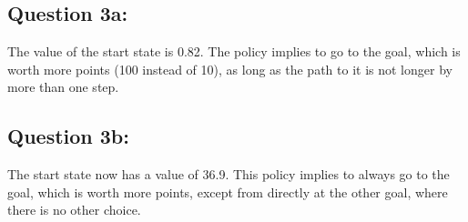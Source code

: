 \subsection*{Question 3a:}\label{sec:3a}

The value of the start state is 0.82.
The policy implies to go to the goal, which is worth more points (100 instead of 10), as long as the path to it is not longer by more than one step.

\subsection*{Question 3b:}\label{sec:3b}

The start state now has a value of 36.9.
This policy implies to always go to the goal, which is worth more points, except from directly at the other goal, where there is no other choice.
